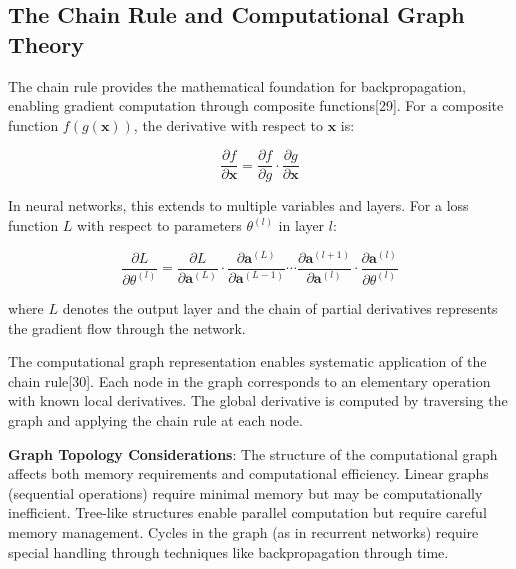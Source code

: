 \documentclass[11pt,a4paper]{report}
\begin{document}
\subsection{The Chain Rule and Computational Graph Theory}

The chain rule provides the mathematical foundation for backpropagation, enabling gradient computation through composite functions[29]. For a composite function $f(g(\mathbf{x}))$, the derivative with respect to $\mathbf{x}$ is:

\begin{equation}
\frac{\partial f}{\partial \mathbf{x}} = \frac{\partial f}{\partial g} \cdot \frac{\partial g}{\partial \mathbf{x}}
\end{equation}

In neural networks, this extends to multiple variables and layers. For a loss function $L$ with respect to parameters $\theta^{(l)}$ in layer $l$:

\begin{equation}
\frac{\partial L}{\partial \theta^{(l)}} = \frac{\partial L}{\partial \mathbf{a}^{(L)}} \cdot \frac{\partial \mathbf{a}^{(L)}}{\partial \mathbf{a}^{(L-1)}} \cdots \frac{\partial \mathbf{a}^{(l+1)}}{\partial \mathbf{a}^{(l)}} \cdot \frac{\partial \mathbf{a}^{(l)}}{\partial \theta^{(l)}}
\end{equation}

where $L$ denotes the output layer and the chain of partial derivatives represents the gradient flow through the network.

The computational graph representation enables systematic application of the chain rule[30]. Each node in the graph corresponds to an elementary operation with known local derivatives. The global derivative is computed by traversing the graph and applying the chain rule at each node.

\textbf{Graph Topology Considerations}: The structure of the computational graph affects both memory requirements and computational efficiency. Linear graphs (sequential operations) require minimal memory but may be computationally inefficient. Tree-like structures enable parallel computation but require careful memory management. Cycles in the graph (as in recurrent networks) require special handling through techniques like backpropagation through time.
\end{document}
